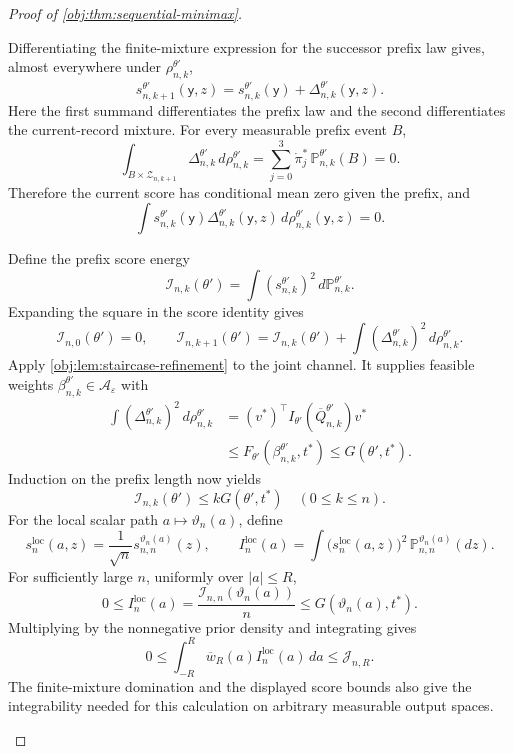 \documentclass[11pt]{article}
\begin{document}
\begin{proof}[Proof of \cref{obj:thm:sequential-minimax}]
\begin{enumerate}
Differentiating the finite-mixture expression for the successor prefix law gives, almost everywhere under \(\rho_{n,k}^{\theta'}\),
\[
s_{n,k+1}^{\theta'}(\mathsf y,z)
=
s_{n,k}^{\theta'}(\mathsf y)
+
\Delta_{n,k}^{\theta'}(\mathsf y,z).
\]
Here the first summand differentiates the prefix law and the second differentiates the current-record mixture. For every measurable prefix event \(B\),
\[
\int_{B\times\mathcal Z_{n,k+1}}
\Delta_{n,k}^{\theta'}\,d\rho_{n,k}^{\theta'}
=
\sum_{j=0}^3\dot\pi_j^*\,
\mathbb P_{n,k}^{\theta'}(B)
=
0.
\]
Therefore the current score has conditional mean zero given the prefix, and
\[
\int
s_{n,k}^{\theta'}(\mathsf y)\Delta_{n,k}^{\theta'}(\mathsf y,z)
\,d\rho_{n,k}^{\theta'}(\mathsf y,z)
=
0.
\]

Define the prefix score energy
\[
\mathcal I_{n,k}(\theta')
=
\int (s_{n,k}^{\theta'})^2\,d\mathbb P_{n,k}^{\theta'}.
\]
Expanding the square in the score identity gives
\[
\mathcal I_{n,0}(\theta')=0,
\qquad
\mathcal I_{n,k+1}(\theta')
=
\mathcal I_{n,k}(\theta')
+
\int(\Delta_{n,k}^{\theta'})^2\,d\rho_{n,k}^{\theta'}.
\]
Apply \cref{obj:lem:staircase-refinement} to the joint channel. It supplies feasible weights
\(\beta_{n,k}^{\theta'}\in\mathcal A_\varepsilon\) with
\[
\begin{aligned}
\int(\Delta_{n,k}^{\theta'})^2\,d\rho_{n,k}^{\theta'}
&=(v^*)^\top
I_{\theta'}(\overline Q_{n,k}^{\theta'})v^*\\
&\le F_{\theta'}(\beta_{n,k}^{\theta'},t^*)
\le G(\theta',t^*).
\end{aligned}
\]
Induction on the prefix length now yields
\[
\mathcal I_{n,k}(\theta')\le kG(\theta',t^*)
\quad(0\le k\le n).
\]
For the local scalar path \(a\mapsto\vartheta_n(a)\), define
\[
s_n^{\mathrm{loc}}(a,z)
=
\frac{1}{\sqrt n}s_{n,n}^{\vartheta_n(a)}(z),
\qquad
I_n^{\mathrm{loc}}(a)
=
\int\bigl(s_n^{\mathrm{loc}}(a,z)\bigr)^2
\,\mathbb P_{n,n}^{\vartheta_n(a)}(dz).
\]
For sufficiently large \(n\), uniformly over \(|a|\le R\),
\[
0\le I_n^{\mathrm{loc}}(a)
=
\frac{\mathcal I_{n,n}(\vartheta_n(a))}{n}
\le G(\vartheta_n(a),t^*).
\]
Multiplying by the nonnegative prior density and integrating gives
\[
0\le
\int_{-R}^{R}\overline w_R(a)I_n^{\mathrm{loc}}(a)\,da
\le\mathcal J_{n,R}.
\]
The finite-mixture domination and the displayed score bounds also give the integrability needed for this calculation on arbitrary measurable output spaces.


\end{enumerate}
\end{proof}
\end{document}
